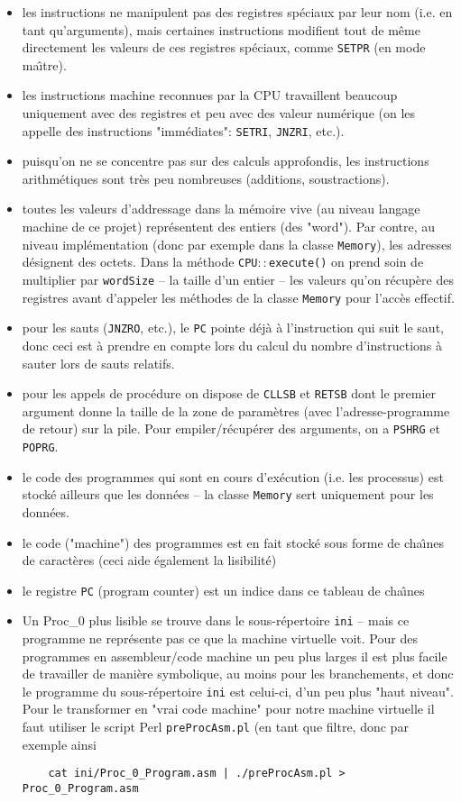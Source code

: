 \documentclass{article}
\begin{document}
\begin{itemize}
\item les instructions ne manipulent pas des registres
sp\'eciaux par leur nom (i.e. en tant qu'arguments), mais certaines instructions
modifient tout de m\^eme directement les valeurs de ces registres sp\'eciaux,
comme \texttt{SETPR} (en mode ma\^\i tre). 
\item les instructions machine reconnues par la CPU travaillent beaucoup
uniquement  avec des registres et peu avec des
valeur num\'erique (on les appelle des instructions "imm\'ediates": 
\texttt{SETRI}, \texttt{JNZRI}, etc.). 
\item puisqu'on ne
se concentre pas sur des calculs approfondis, les instructions
arithm\'etiques sont tr\`es peu nombreuses (additions, soustractions).
\item toutes les valeurs d'addressage dans la m\'emoire vive (au niveau langage
machine de ce projet) repr\'esentent des entiers (des "word"). Par contre,
au niveau impl\'ementation (donc par exemple dans la classe \texttt{Memory}), les
adresses d\'esignent des octets. Dans la m\'ethode \texttt{CPU$::$execute()}
on prend soin de multiplier par \texttt{wordSize} -- la taille d'un entier
-- les valeurs qu'on r\'ecup\`ere des registres avant d'appeler les
m\'ethodes de la classe  \texttt{Memory} pour l'acc\`es effectif. 
\item pour les sauts
(\texttt{JNZRO}, etc.), le \texttt{PC} pointe d\'ej\`a \`a l'instruction qui
suit le saut, donc ceci est \`a prendre en compte lors du calcul du nombre
d'instructions \`a sauter lors de sauts relatifs. 
\item pour les appels de
proc\'edure on dispose de \texttt{CLLSB} et \texttt{RETSB} dont le premier
argument donne la taille de la zone de param\`etres (avec l'adresse-programme
de retour) sur la pile. Pour empiler/r\'ecup\'erer des arguments, on a
\texttt{PSHRG} et \texttt{POPRG}.
\item le code des programmes qui sont en cours d'ex\'ecution (i.e. les
processus) est stock\'e ailleurs que les donn\'ees -- la classe
\texttt{Memory} sert uniquement pour les donn\'ees.
\item le code ("machine") des programmes est en fait stock\'e sous forme de
cha\^\i nes de caract\`eres (ceci aide \'egalement la lisibilit\'e)
\item le registre \texttt{PC} (program counter) est un indice dans ce tableau
de cha\^\i nes
\item Un Proc\_0 plus lisible se trouve dans le sous-r\'epertoire \texttt{ini}
  -- mais ce programme ne repr\'esente pas ce que la machine virtuelle
  voit. Pour des programmes en assembleur/code machine un peu plus larges il
  est plus facile de travailler de mani\`ere symbolique, au moins pour les
  branchements, et donc le programme du  sous-r\'epertoire \texttt{ini} est
  celui-ci, d'un peu plus "haut niveau". Pour le transformer en "vrai code
  machine" pour notre machine virtuelle il faut utiliser le script Perl
  \texttt{preProcAsm.pl} (en tant que filtre, donc par exemple ainsi
\begin{verbatim}
    cat ini/Proc_0_Program.asm | ./preProcAsm.pl > Proc_0_Program.asm
\end{verbatim}
  

\end{itemize}
\end{document}
